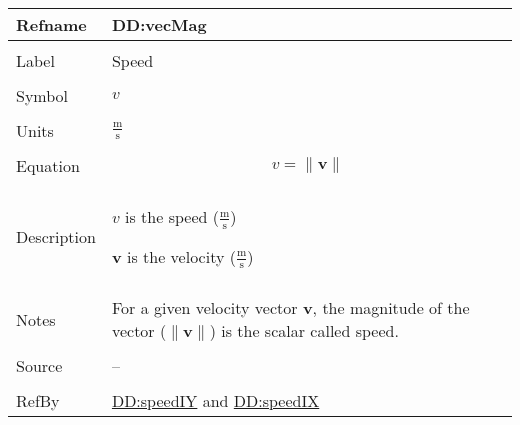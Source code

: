\documentclass[12pt]{article}
\begin{document}
\vspace{\baselineskip}
\noindent
\begin{minipage}{\textwidth}
\begin{tabular}{>{\raggedright}p{}>{\raggedright\arraybackslash}p{}}
\toprule \textbf{Refname} & \textbf{DD:vecMag}
\label{DD:vecMag}
\\ \midrule \\
Label & Speed
        
\\ \midrule \\
Symbol & $v$
         
\\ \midrule \\
Units & $\frac{\text{m}}{\text{s}}$
        
\\ \midrule \\
Equation & \begin{displaymath}
           v=\|\mathbf{v}\|
           \end{displaymath}
\\ \midrule \\
Description & \begin{symbDescription}
              \item{$v$ is the speed ($\frac{\text{m}}{\text{s}}$)}
              \item{$\mathbf{v}$ is the velocity ($\frac{\text{m}}{\text{s}}$)}
              \end{symbDescription}
\\ \midrule \\
Notes & For a given velocity vector $\mathbf{v}$, the magnitude of the vector ($\|\mathbf{v}\|$) is the scalar called speed.
        
\\ \midrule \\
Source & --
         
\\ \midrule \\
RefBy & \hyperref[DD:speedIY]{DD:speedIY} and \hyperref[DD:speedIX]{DD:speedIX}
        
\\ \bottomrule
\end{tabular}
\end{minipage}
\end{document}
